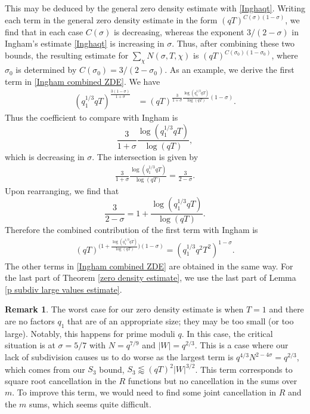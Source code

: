 \documentclass[12pt]{amsart}
\theoremstyle{definition}
\newtheorem{remark}[theorem]{Remark}
\theoremstyle{plain}
\theoremstyle{remark}
\numberwithin{equation}{section}
\numberwithin{theorem}{section}
\numberwithin{equation}{section}
\begin{document}
	This may be deduced by the general zero density estimate with
	\eqref{Inghaqt}. Writing each term in the general zero density estimate in the
	form $(qT)^{C(\sigma)(1-\sigma)}$, we find that in each case $C(\sigma)$ is
	decreasing, whereas the exponent $3/(2-\sigma)$ in Ingham's estimate
	\eqref{Inghaqt} is increasing in $\sigma$. Thus, after combining these two
	bounds, the resulting estimate for $\sum_{\chi}N(\sigma,T,\chi)$ is
	$(qT)^{C(\sigma_0)(1-\sigma_0)}$, where $\sigma_0$ is determined by
	$C(\sigma_0)=3/(2-\sigma_0)$. As an example, we derive the first term in
	\eqref{Ingham combined ZDE}.
	We have
	\begin{align*}
		(q_1^{1/3}qT)^{\frac{3(1-\sigma)}{1+\sigma}}
		&=(qT)^{{\frac{3}{1+\sigma}\frac{\log(q_1^{1/3}qT)}{\log(qT)}}(1-\sigma)}.
	\end{align*}
	Thus the coefficient to compare with Ingham is
	\[
	\frac{3}{1+\sigma}\frac{\log(q_1^{1/3}qT)}{\log(qT)},
	\]
	which is decreasing in $\sigma$. The intersection is given by
	\begin{align*}
		\frac{3}{1+\sigma}\frac{\log(q_1^{1/3}qT)}{\log(qT)}
		=\frac{3}{2-\sigma}.
	\end{align*}
	Upon rearranging, we find that
	\[
	\frac{3}{2-\sigma}
	=1+\frac{\log(q_1^{1/3}qT)}{\log(qT)}.
	\]
	Therefore the combined contribution of the first term with Ingham is
	\begin{align*}
		(qT)^{\big(1+\frac{\log(q_1^{1/3}qT)}{\log(qT)}\big)(1-\sigma)}
		=(q_1^{1/3}q^2T^2)^{1-\sigma}.
	\end{align*}
	The other terms in \eqref{Ingham combined ZDE} are obtained in the same way. For the last part of Theorem \ref{zero density estimate}, we use the last part of Lemma \ref{p subdiv large values estimate}.
	\begin{remark}
		The worst case for our zero density estimate is when $T=1$ and there are no factors $q_1$ that are of an appropriate size; they may be too small (or too large). Notably, this happens for prime moduli $q$. In this case, the critical situation is at $\sigma = 5/7$ with $N=q^{7/9}$ and $|W|=q^{2/3}$. This is a case where our lack of subdivision causes us to do worse as the largest term is $q^{4/3}N^{2-4\sigma} = q^{2/3}$, which comes from our $S_3$ bound, $S_3 \lessapprox (qT)^2|W|^{3/2}$. This term corresponds to square root cancellation in the $R$ functions but no cancellation in the sums over $m$. To improve this term, we would need to find some joint cancellation in $R$ and the $m$ sums, which seems quite difficult.
	\end{remark}
\end{document}
